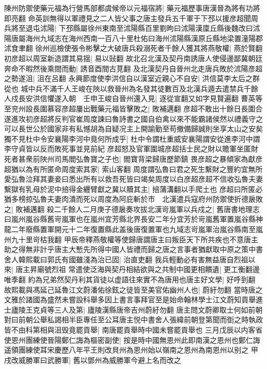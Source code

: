 陳州防禦使藥元福為行營馬部都虞候帝以元福宿將|{
	藥元福歷事唐漢晉為將有功將即亮翻}
命英訓無得以軍禮見之二人皆父事之唐主發兵五千軍于下邳以援彦超聞周兵將至退屯沭陽|{
	下邳縣屬徐州東南至沭陽縣百里劉昫曰沭陽漢廩丘縣後魏改曰沭陽唐屬海州九域志在海州西南一百八十里杜佑曰海州沭陽縣漢原丘縣地梁置潼陽郡沭食聿翻}
徐州巡檢使張令彬擊之大破唐兵殺溺死者千餘人獲其將燕敬權|{
	燕於賢翻}
初彦超以周室新造謂其易揺|{
	易以䜴翻}
故北召北漢及契丹南誘唐人使侵邊鄙冀朝廷奔命不暇然後乘間而動|{
	誘音酉間古莧翻}
及北漢契丹自晉州北走唐兵敗於沭陽彦超之勢遂沮|{
	沮在呂翻}
永興節度使李洪信自以漢室近親心不自安|{
	洪信莫李太后之群從也}
城中兵不滿千人王峻在陜以救晉州為名發其徒數百及北漢兵遁去遣禁兵千餘人戍長安洪信懼遂入朝　壬申王峻自晉州還入見|{
	逐從宣翻又如字見賢遍翻}
曹英等至兖州設長圍慕容彦超屢出戰藥元福皆擊敗之|{
	敗補邁翻}
彦超不敢出十餘日長圍合遂進攻初彦超將反判官崔周度諫曰魯詩書之國自伯禽以來不能霸諸侯然以禮義守之可以長世公於國家非有私憾胡為自疑况主上開諭勤至苟撤備歸誠則坐享太山之安矣獨不見杜中令安襄陽李河中竟何所成乎|{
	杜中令謂杜重威安襄陽謂安從進李河中謂李守貞皆以反而敗死事並見前紀}
彦超怒及官軍圍城彦超括士民之財以贍軍坐匿財死者甚衆前陜州司馬閻弘魯寶之子也|{
	閻寶背梁歸唐歷節鎮}
畏彦超之暴傾家為獻彦超猶以為有所匿命周度索其家|{
	索山客翻}
周度謂弘魯曰君之死生繫財之豐約宜無所愛弘魯泣拜其妻妾曰悉出所有以救吾死皆曰竭矣周度以白彦超彦超不信收弘魯夫妻繫獄有乳母於泥中掊得金纒臂獻之冀以贖其主|{
	掊蒲溝翻以手爬土也}
彦超曰所匿必猶多榜掠弘魯夫妻肉潰而死以周度為阿庇斬於市　北漢遣兵寇府州防禦使折德扆敗之|{
	敗補邁翻}
殺二千餘人二月庚子德扆奏攻拔北漢岢嵐軍以兵戍之|{
	舊唐書地理志曰嵐州嵐谷縣舊岢嵐軍也在嵐州宜芳縣北界長安二年分宜芳於岢嵐舊軍置嵐谷縣神龍二年廢縣置軍開元十二年復置縣此盖後唐復置軍也九域志岢嵐軍治嵐谷縣南至嵐州九十里岢枯我翻}
甲辰帝釋燕敬權等使歸唐謂唐主曰叛臣天下所共疾也不意唐主助之得無非計乎唐主大慙先所得中國人皆禮而歸之唐之言事者猶獻取中原之策中書舍人韓熙載曰郭氏有國雖淺為治已固|{
	治直吏翻}
我兵輕動必有害無益唐自烈祖以來|{
	唐主昇廟號烈祖}
常遣使泛海與契丹相結欲與之共制中國更相饋遺|{
	更工衡翻邊唯季翻}
約為兄弟然契丹利其貨徒以虚語往來實不為唐用也唐主好文學|{
	好呼到翻}
故熙載與馮延己延魯江文蔚潘佑徐鉉之徒皆至美官佑幽州人也|{
	蔚紆勿翻}
當時唐之文雅於諸國為盛然未嘗設科舉多因上書言事拜官至是始命翰林學士江文蔚知貢舉進士廬陵王克貞等三人及第|{
	廬陵漢縣唐帝吉州蔚紆勿翻}
唐主問文蔚卿取士何如前朝對曰前朝公舉私謁相半臣專任至公耳唐主悦中書舍人張緯前朝登第聞而衘之時執政皆不由科第相與沮毁竟罷貢舉|{
	南唐罷貢舉時中國未嘗罷貢舉也}
三月戊辰以内客省使恩州團練使晉陽鄭仁誨為樞密副使|{
	按是時中國無恩州此即南漢之恩州也鄭仁誨遥領團練使耳宋慶歷八年平王則改貝州為恩州始以嶺南之恩州為南恩州以别之}
甲戌改威勝軍曰武勝軍|{
	舊以鄧州為威勝軍今避上名而改之}
